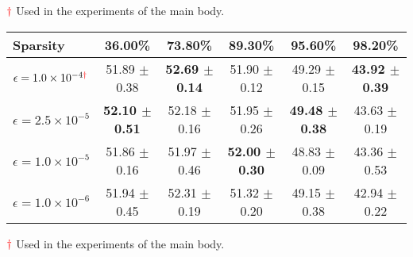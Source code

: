 \begin{table*}
\begin{center}
{\begin{tabular}{l ccccc}
    \bottomrule
    \end{tabular}
    
    }
    
    \end{center}
    \footnotesize{$\color{red}{\dagger}$ Used in the experiments of the main body.}
        \begin{center}
    \caption{Ablation study of perturbation hyper-parameter $\epsilon$ on Tiny-ImageNet (ResNet-18). Best results are in \textbf{bold}.}     \label{tab:appendix-ablation-perturb-tiny}
    \resizebox{1\linewidth}{!}
    {
    \begin{tabular}{l ccccc}
    \\
    \hline
    \toprule
    Sparsity & 36.00\% & 73.80\% & 89.30\% & 95.60\% & 98.20\% \\
    \midrule
    $\epsilon = 1.0 \times 10^{-4 \color{red}{\dagger}}$  & 51.89 $\pm$ 0.38 & \textbf{52.69 $\pm$ 0.14} & 51.90 $\pm$ 0.12 & 49.29 $\pm$ 0.15 & \textbf{43.92 $\pm$ 0.39}   \\
    $\epsilon = 2.5 \times 10^{-5}$ & \textbf{52.10 $\pm$ 0.51} & 52.18 $\pm$ 0.16 & 51.95 $\pm$ 0.26 & \textbf{49.48 $\pm$ 0.38} & 43.63 $\pm$ 0.19 \\
    $\epsilon = 1.0 \times 10^{-5}$ & 51.86 $\pm$ 0.16 & 51.97 $\pm$ 0.46 & \textbf{52.00 $\pm$ 0.30} & 48.83 $\pm$ 0.09 & 43.36 $\pm$ 0.53  \\
    $\epsilon = 1.0 \times 10^{-6}$ & 51.94 $\pm$ 0.45 & 52.31 $\pm$ 0.19 & 51.32 $\pm$ 0.20 & 49.15 $\pm$ 0.38 & 42.94 $\pm$ 0.22 \\

    \bottomrule
    \end{tabular}
    
    }
    
    \end{center}
    \footnotesize{$\color{red}{\dagger}$ Used in the experiments of the main body.}
\end{table*}